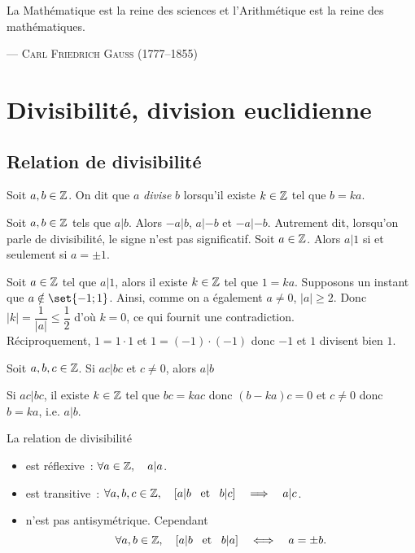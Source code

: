 \documentclass{magnolia}
\begin{document}
\setlength{}
\epigraph{\og La Mathématique est la reine des sciences et l'Arithmétique est
la reine des mathématiques. \fg}{--- \textsc{Carl Friedrich Gauss (1777--1855)}}

\magtoc

\section{Divisibilité, division euclidienne}

\subsection{Relation de divisibilité}
\begin{definition}
Soit $a,b\in\mathbb{Z}$. On dit que $a$ \emph{divise} $b$ lorsqu'il existe $k\in\mathbb{Z}$ tel que
$b=ka$.  
\end{definition}

\begin{remarques}
\remarque Soit $a,b\in\mathbb{Z}$ tels que $a|b$. Alors $-a|b$, $a|-b$ et $-a|-b$.
  Autrement dit, lorsqu'on parle de divisibilité, le signe n'est pas
  significatif.
\remarque Soit $a\in\mathbb{Z}$. Alors $a|1$ si et seulement si $a=\pm 1$.
\begin{sol}
Soit $a\in\mathbb{Z}$ tel que $a|1$, alors il existe $k\in \mathbb{Z}$ tel que $1=ka$. Supposons un instant que $a\notin\set{-1;1}$. Ainsi, comme on a également $a\neq 0$, $|a|\geq 2$. Donc $|k|=\dfrac{1}{|a|}\leq \dfrac{1}{2}$ d'où $k=0$, ce qui fournit une contradiction.\\
Réciproquement, $1=1\cdot 1$ et $1=(-1)\cdot(-1)$ donc $-1$ et $1$ divisent bien $1$.
\end{sol}
\remarque Soit $a,b,c\in\mathbb{Z}$. Si $ac|bc$ et $c\neq 0$, alors $a|b$
\begin{sol}
Si $ac|bc$, il existe $k\in \mathbb{Z}$ tel que $bc=kac$ donc $(b-ka)c=0$ et $c\neq 0$ donc $b=ka$, i.e. $a|b$.
\end{sol}
\end{remarques}

\begin{proposition}
La relation de divisibilité
\begin{itemize}
\item est réflexive~: $\forall a\in\mathbb{Z} ,\quad a|a$.
\item est transitive~: $\forall a,b,c\in\mathbb{Z} ,\quad \left[a|b \quad\!\text{et}\quad\! b|c\right]\quad\Longrightarrow\quad a|c$.
\item n'est pas antisymétrique. Cependant
  \[\forall a,b\in\mathbb{Z} ,\quad \left[a|b \quad\!\text{et}\quad\! b|a\right]\quad\Longleftrightarrow\quad a=\pm b.\]
\end{itemize}
\end{proposition}
\end{document}
